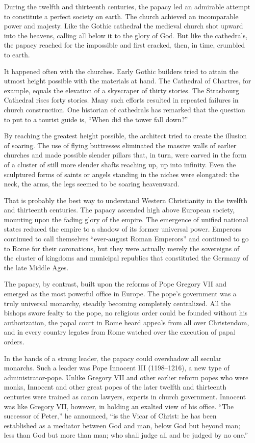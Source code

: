 During the twelfth and thirteenth centuries, the papacy led an admirable attempt to constitute a
perfect society on earth. The church achieved an incomparable power and majesty. Like the Gothic
cathedral the medieval church shot upward into the heavens, calling all below it to the glory of
God. But like the cathedrals, the papacy reached for the impossible and first cracked, then, in
time, crumbled to earth.

It happened often with the churches. Early Gothic builders tried to attain the utmost height
possible with the materials at hand. The Cathedral of Chartres, for example, equals the elevation of
a skyscraper of thirty stories. The Strasbourg Cathedral rises forty stories. Many such efforts
resulted in repeated failures in church construction. One historian of cathedrals has remarked that
the question to put to a tourist guide is, “When did the tower fall down?”

By reaching the greatest height possible, the architect tried to create the illusion of soaring. The
use of flying buttresses eliminated the massive walls of earlier churches and made possible slender
pillars that, in turn, were carved in the form of a cluster of still more slender shafts reaching
up, up into infinity. Even the sculptured forms of saints or angels standing in the niches were
elongated: the neck, the arms, the legs seemed to be soaring heavenward.

That is probably the best way to understand Western Christianity in the twelfth and thirteenth
centuries. The papacy ascended high above European society, mounting upon the fading glory of the
empire. The emergence of unified national states reduced the empire to a shadow of its former
universal power. Emperors continued to call themselves “ever-august Roman Emperors” and continued to
go to Rome for their coronations, but they were actually merely the sovereigns of the cluster of
kingdoms and municipal republics that constituted the Germany of the late Middle Ages.

The papacy, by contrast, built upon the reforms of Pope Gregory VII and emerged as the most powerful
office in Europe. The pope’s government was a truly universal monarchy, steadily becoming completely
centralized. All the bishops swore fealty to the pope, no religious order could be founded without
his authorization, the papal court in Rome heard appeals from all over Christendom, and in every
country legates from Rome watched over the execution of papal orders.

In the hands of a strong leader, the papacy could overshadow all secular monarchs. Such a leader was
Pope Innocent III (1198–1216), a new type of administrator-pope. Unlike Gregory VII and other
earlier reform popes who were monks, Innocent and other great popes of the later twelfth and
thirteenth centuries were trained as canon lawyers, experts in church government. Innocent was like
Gregory VII, however, in holding an exalted view of his office. “The successor of Peter,” he
announced, “is the Vicar of Christ: he has been established as a mediator between God and man, below
God but beyond man; less than God but more than man; who shall judge all and be judged by no one.”

